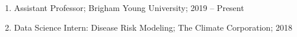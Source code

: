 \documentclass[12pt]{article}
\newcommand{\head}[1]{ %
    \bigskip %
    \begin{large}\begin{bf}{#1}\end{bf}\end{large} %

    \ \\ [-1.3cm] %

    \hrulefill}
\begin{document}
\begin{enumerate}[label=$\bullet$]

\item Assistant Professor; Brigham Young University; 2019 -- Present


\item Data Science Intern: Disease Risk Modeling; The Climate Corporation; 2018




\end{enumerate}



%
\end{document}
